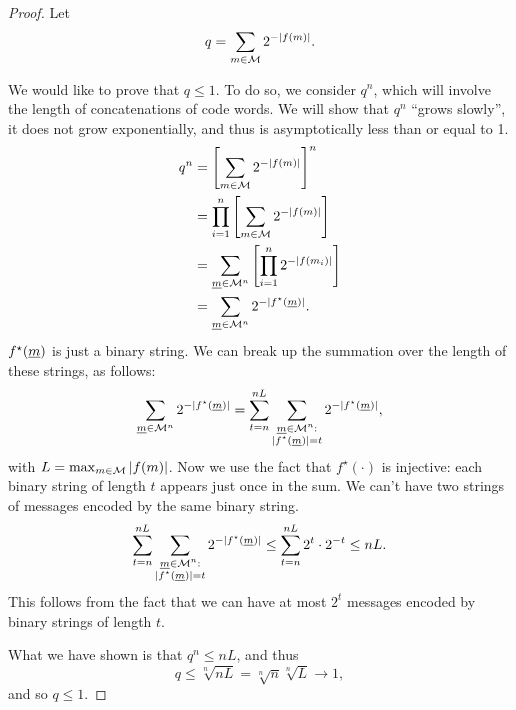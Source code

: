 \begin{proof}
	Let
	\begin{equation*}
		q = \sum_{m \in \mathcal{M}} 2^{-\left|{f(m)}\right|}.
	\end{equation*}

	We would like to prove that $q \le 1$.
	To do so, we consider $q^n$, which will involve the length of concatenations of code words.
	We will show that $q^n$ ``grows slowly'', \ie it does not grow exponentially, and thus is asymptotically less than or equal to 1. 
	\begin{align*}
		q^n
		& =
		\left[ \sum_{m \in \mathcal{M}} 2^{-\left|{f(m)}\right|} \right]^n
		\\
		& =
		\prod_{i = 1}^n \left[ \sum_{m \in \mathcal{M}} 2^{-\left|{f(m)}\right|} \right]
		\\
		& =
		\sum_{\underline{m} \in \mathcal{M}^n} \left[ \prod_{i = 1}^n 2^{-\left|{f(m_i)}\right|} \right]
		\\
		& =
		\sum_{\underline{m} \in \mathcal{M}^n} 2^{-\left|{f^{\star}(\underline{m})}\right|}.
	\end{align*}
	$f^{\star}(\underline{m})$ is just a binary string.
	We can break up the summation over the length of these strings, as follows:
	\begin{equation*}
		\sum_{\underline{m} \in \mathcal{M}^n} 2^{-\left|{f^{\star}(\underline{m})}\right|}
		=
		\sum_{t = n}^{nL}
		\sum_{
			\substack{
				\underline{m} \in \mathcal{M}^n : \\
				\left|{f^{\star}(\underline{m})}\right| = t
			}
		} 2^{-\left|{f^{\star}(\underline{m})}\right|},
	\end{equation*}
	with $L = \max_{m \in \mathcal{M}} \left|{f(m)}\right|$.
	Now we use the fact that $f^{\star}(\cdot)$ is injective: each binary string of length $t$ appears just once in the sum.
	We can't have two strings of messages encoded by the same binary string.
	\begin{equation*}
		\sum_{t = n}^{nL}
		\sum_{
			\substack{
				\underline{m} \in \mathcal{M}^n : \\
				\left|{f^{\star}(\underline{m})}\right| = t
			}
		} 2^{-\left|{f^{\star}(\underline{m})}\right|}
		\le
		\sum_{t = n}^{nL} 2^t \cdot 2^{-t}
		\leq
		nL.
	\end{equation*}
	This follows from the fact that we can have at most $2^{t}$ messages encoded by binary strings of length $t$.

	What we have shown is that $q^n \le nL$, and thus
	\begin{equation*}
		q \le \sqrt[n]{nL}
		=
		\sqrt[n]{n} \sqrt[n]{L}
		\to 1,
	\end{equation*}
	and so $q \le 1$.
\end{proof}


